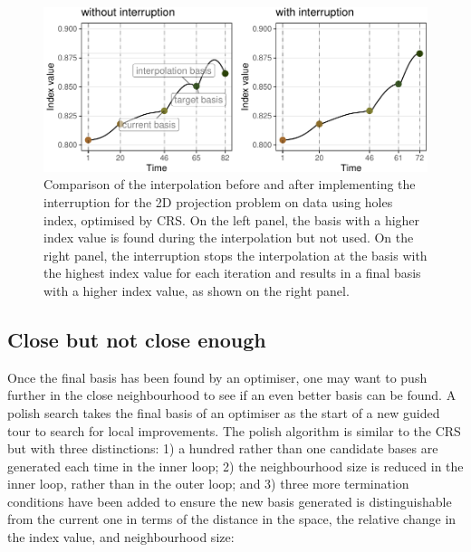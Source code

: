 \begin{Schunk}
\begin{figure}

{\centering \includegraphics[width=1\linewidth]{figs/interrupt} 

}

\caption[Comparison of the interpolation before and after implementing the interruption for the 2D projection problem on  data using holes index, optimised by CRS]{Comparison of the interpolation before and after implementing the interruption for the 2D projection problem on  data using holes index, optimised by CRS. On the left panel, the basis with a higher index value is found during the interpolation but not used. On the right panel, the interruption stops the interpolation at the basis with the highest index value for each iteration and results in a final basis with a higher index value, as shown on the right panel.}\label{fig:interruption}
\end{figure}
\end{Schunk}

\hypertarget{close-but-not-close-enough}{%
\subsection{Close but not close
enough}\label{close-but-not-close-enough}}

Once the final basis has been found by an optimiser, one may want to
push further in the close neighbourhood to see if an even better basis
can be found. A polish search takes the final basis of an optimiser as
the start of a new guided tour to search for local improvements. The
polish algorithm is similar to the CRS but with three distinctions: 1) a
hundred rather than one candidate bases are generated each time in the
inner loop; 2) the neighbourhood size is reduced in the inner loop,
rather than in the outer loop; and 3) three more termination conditions
have been added to ensure the new basis generated is distinguishable
from the current one in terms of the distance in the space, the relative
change in the index value, and neighbourhood size:


